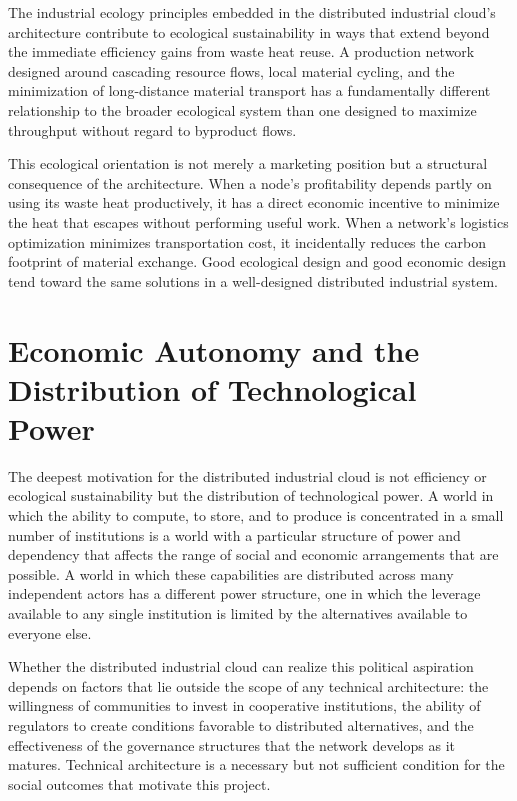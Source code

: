 \documentclass[12pt]{book}
\theoremstyle{definition}
\theoremstyle{remark}
\begin{document}
The industrial ecology principles embedded in the distributed
industrial cloud's architecture contribute to ecological sustainability
in ways that extend beyond the immediate efficiency gains from waste
heat reuse. A production network designed around cascading resource
flows, local material cycling, and the minimization of long-distance
material transport has a fundamentally different relationship to
the broader ecological system than one designed to maximize throughput
without regard to byproduct flows.

This ecological orientation is not merely a marketing position but
a structural consequence of the architecture. When a node's
profitability depends partly on using its waste heat productively,
it has a direct economic incentive to minimize the heat that escapes
without performing useful work. When a network's logistics
optimization minimizes transportation cost, it incidentally reduces
the carbon footprint of material exchange. Good ecological design
and good economic design tend toward the same solutions in a
well-designed distributed industrial system.

\section{Economic Autonomy and the Distribution of Technological Power}

The deepest motivation for the distributed industrial cloud is not
efficiency or ecological sustainability but the distribution of
technological power. A world in which the ability to compute, to
store, and to produce is concentrated in a small number of
institutions is a world with a particular structure of power and
dependency that affects the range of social and economic
arrangements that are possible. A world in which these capabilities
are distributed across many independent actors has a different power
structure, one in which the leverage available to any single
institution is limited by the alternatives available to everyone else.

Whether the distributed industrial cloud can realize this political
aspiration depends on factors that lie outside the scope of any
technical architecture: the willingness of communities to invest in
cooperative institutions, the ability of regulators to create
conditions favorable to distributed alternatives, and the
effectiveness of the governance structures that the network develops
as it matures. Technical architecture is a necessary but not
sufficient condition for the social outcomes that motivate this
project.
\end{document}
